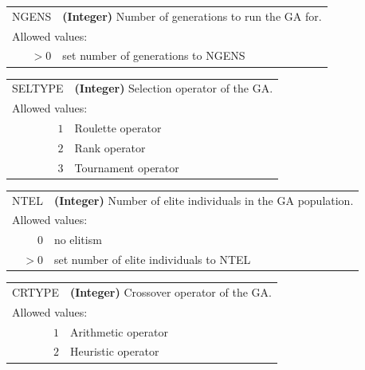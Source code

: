 \documentclass[10pt,a4paper,openany]{memoir}
\numberwithin{equation}{section}
\begin{document}
{
\begin{tabular}{r@{ : }l}
\label{descr:ngens}
     NGENS&\textbf{(Integer)} Number of generations to run the GA for.                                                             \\ 
\multicolumn{2}{l}{Allowed values:} \\ 
    \(>0\)&set number of generations to NGENS                                                                   \\ 
\end{tabular}
\vspace{1ex}
}

{
\begin{tabular}{r@{ : }l}
\label{descr:seltype}
   SELTYPE&\textbf{(Integer)} Selection operator of the GA.                                                                        \\ 
\multicolumn{2}{l}{Allowed values:} \\ 
     \(1\)&Roulette operator                                                                                    \\ 
     \(2\)&Rank operator                                                                                        \\ 
     \(3\)&Tournament operator                                                                                  \\ 
\end{tabular}
\vspace{1ex}
}

{
\begin{tabular}{r@{ : }l}
\label{descr:ntel}
      NTEL&\textbf{(Integer)} Number of elite individuals in the GA population.                                                    \\ 
\multicolumn{2}{l}{Allowed values:} \\ 
     \(0\)&no elitism                                                                                           \\ 
    \(>0\)&set number of elite individuals to NTEL                                                              \\ 
\end{tabular}
\vspace{1ex}
}

{
\begin{tabular}{r@{ : }l}
\label{descr:crtype}
    CRTYPE&\textbf{(Integer)} Crossover operator of the GA.                                                                       \\ 
\multicolumn{2}{l}{Allowed values:} \\ 
     \(1\)&Arithmetic operator                                                                                  \\ 
     \(2\)&Heuristic operator                                                                                   \\ 
\end{tabular}
\vspace{1ex}
}
\end{document}
